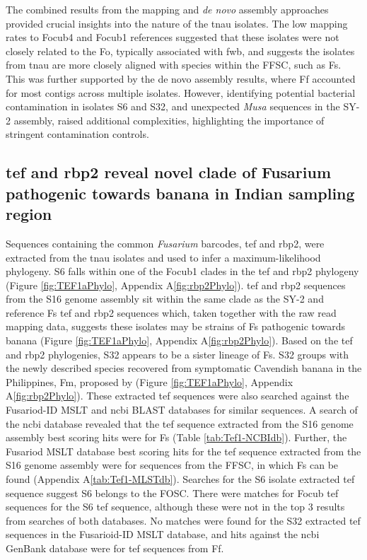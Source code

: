 The combined results from the mapping and \textit{de novo} assembly approaches provided crucial insights into the nature of the \ac{tnau} isolates. The low mapping rates to \ac{Focub4} and \ac{Focub1} references suggested that these isolates were not closely related to the \ac{Fo}, typically associated with \ac{fwb}, and suggests the isolates from \ac{tnau} are more closely aligned with species within the \ac{FFSC}, such as \ac{Fs}. This was further supported by the de novo assembly results, where \ac{Ff} accounted for most contigs across multiple isolates. However, identifying potential bacterial contamination in isolates S6 and S32, and unexpected \textit{Musa} sequences in the SY-2 assembly, raised additional complexities, highlighting the importance of stringent contamination controls.

\subsection{\Acl{tef} and \acl{rbp2} reveal novel clade of Fusarium pathogenic towards banana in Indian sampling region}
\label{sec:chap2phylogenies}

 Sequences containing the common \textit{Fusarium} barcodes, \acf{tef}  and \acf{rbp2}, were extracted from the \ac{tnau} isolates and used to infer a maximum-likelihood phylogeny. S6 falls within one of the \ac{Focub1} clades in the \acs{tef} and \ac{rbp2} phylogeny (Figure \ref{fig:TEF1aPhylo}, Appendix A\ref{fig:rbp2Phylo}). \Ac{tef} and \ac{rbp2} sequences from the S16 genome assembly sit within the same clade as the SY-2 and reference \ac{Fs} \ac{tef} and \ac{rbp2} sequences which, taken together with the raw read mapping data, suggests these isolates may be strains of \ac{Fs} pathogenic towards banana (Figure \ref{fig:TEF1aPhylo}, Appendix A\ref{fig:rbp2Phylo}). Based on the \ac{tef} and \ac{rbp2} phylogenies, S32 appears to be a sister lineage of \ac{Fs}. S32 groups with the newly described species recovered from symptomatic Cavendish banana in the Philippines, \acf{Fm}, proposed by \textcite{Nozawa2023}  (Figure \ref{fig:TEF1aPhylo}, Appendix A\ref{fig:rbp2Phylo}). These extracted \ac{tef} sequences were also searched against the Fusariod-ID MSLT \parencite{Robert2013} and \ac{ncbi} BLAST databases for similar sequences. A search of the \ac{ncbi} database revealed that the \ac{tef} sequence extracted from the S16 genome assembly best scoring hits were for \ac{Fs} (Table \ref{tab:Tef1-NCBIdb}). Further, the Fusariod MSLT database best scoring hits for the \ac{tef} sequence extracted from the S16 genome assembly were for sequences from the \ac{FFSC}, in which \ac{Fs} can be found (Appendix A\ref{tab:Tef1-MLSTdb}). Searches for the S6 isolate extracted \ac{tef} sequence suggest S6 belongs to the \ac{FOSC}. There were matches for \ac{Focub} \ac{tef} sequences for the S6 \ac{tef} sequence, although these were not in the top 3 results from searches of both databases. No matches were found for the S32 extracted \ac{tef} sequences in the Fusarioid-ID MSLT database, and hits against the \ac{ncbi} GenBank database were for \ac{tef} sequences from \ac{Ff}. 

